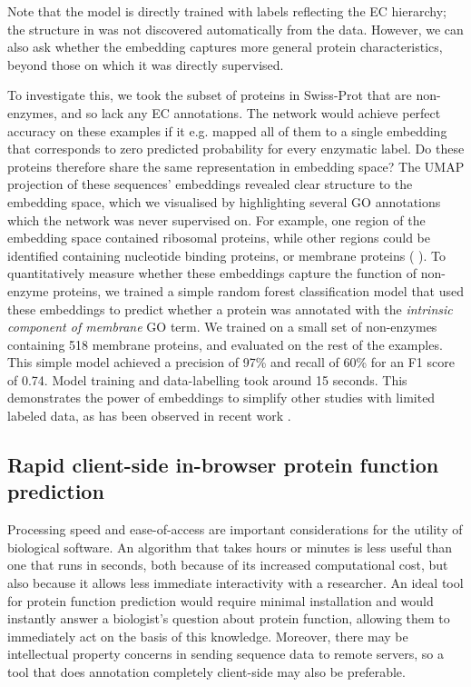 Note that the model is directly trained with labels reflecting the EC hierarchy; the structure in  %
 was not discovered automatically from the data. However, we can also ask whether the embedding captures more general protein characteristics, beyond those on which it was directly supervised.

To investigate this, we took the subset of proteins in Swiss-Prot that are non-enzymes, and so lack any EC annotations. The network would achieve perfect accuracy on these examples if it e.g. mapped all of them to a single embedding that corresponds to zero predicted probability for every enzymatic label. Do these proteins therefore share the same representation in embedding space? The UMAP projection of these sequences' embeddings revealed clear structure to the embedding space, which we visualised by highlighting several GO annotations which the network was never supervised on. For example, one region of the embedding space contained ribosomal proteins, while other regions could be identified containing nucleotide binding proteins, or membrane proteins (%
).
To quantitatively measure whether these embeddings capture the function of non-enzyme proteins, we trained a simple random forest classification model that used these embeddings to predict whether a protein was annotated with the \textit{intrinsic component of membrane} GO term. We trained on a small set of non-enzymes containing 518 membrane proteins, and evaluated on the rest of the examples. This simple model achieved a precision of 97\% and recall of 60\% for an F1 score of 0.74. Model training and data-labelling took around 15 seconds. This demonstrates the power of embeddings to simplify other studies with limited labeled data, as has been observed in recent work \citep{Alley589333,biswas2020low}.

\subsection*{Rapid client-side in-browser protein function prediction}
Processing speed and ease-of-access are important considerations for the utility of biological software. An algorithm that takes hours or minutes is less useful than one that runs in seconds, both because of its increased computational cost, but also because it allows less immediate interactivity with a researcher. An ideal tool for protein function prediction would require minimal installation and would instantly answer a biologist's question about protein function, allowing them to immediately act on the basis of this knowledge. Moreover, there may be intellectual property concerns in sending sequence data to remote servers, so a tool that does annotation completely client-side may also be preferable.

